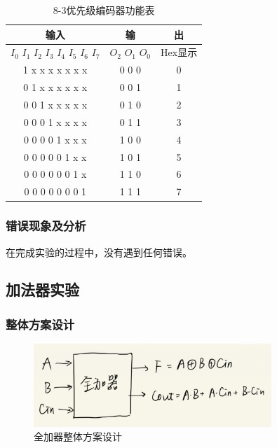 \documentclass{article}
\begin{document}
    \begin{table}[H]
    \centering
    \begin{tabular}{|c|c c|}
        \hline
        输入 & 输 & 出 \\ \hline
        $I_{0}$ $I_{1}$ $I_{2}$ $I_{3}$ $I_{4}$ $I_{5}$ $I_{6}$ $I_{7}$ & $O_{2}$ $O_{1}$ $O_{0}$ & Hex显示 \\ \hline
        1 x x x x x x x & 0 0 0 & 0 \\ \hline
        0 1 x x x x x x & 0 0 1 & 1 \\ \hline
        0 0 1 x x x x x & 0 1 0 & 2 \\ \hline
        0 0 0 1 x x x x & 0 1 1 & 3 \\ \hline
        0 0 0 0 1 x x x & 1 0 0 & 4 \\ \hline
        0 0 0 0 0 1 x x & 1 0 1 & 5 \\ \hline
        0 0 0 0 0 0 1 x & 1 1 0 & 6 \\ \hline
        0 0 0 0 0 0 0 1 & 1 1 1 & 7 \\ \hline
    \end{tabular}
    \caption{8-3优先级编码器功能表}
    \end{table}

    \subsubsection{错误现象及分析}
    在完成实验的过程中，没有遇到任何错误。

    \subsection{加法器实验}

    \subsubsection{整体方案设计}
    \begin{figure}[H]
    \centering
    \includegraphics[width=0.8\textwidth]{3.1.png}
    \caption{全加器整体方案设计}
    \end{figure}
    
\end{document}
